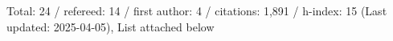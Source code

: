 Total: 24 / refereed: 14 / first author: 4 / citations: 1,891 / h-index: 15 (Last updated: 2025-04-05), List attached below